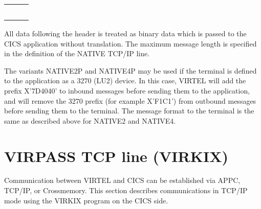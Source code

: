 \documentclass[letterpaper,10pt,english]{sphinxmanual}
\begin{document}
\begin{savenotes}
\begin{tabulary}{\linewidth}[t]{TTT}
{}%
\\
&&\\
&&\\
&&\\
\sphinxbottomrule
\end{tabulary}
\sphinxtableafterendhook\par
\sphinxattableend\end{savenotes}

\sphinxAtStartPar
{}

\sphinxAtStartPar
All data following the header is treated as binary data which is passed to the CICS application without translation. The maximum message length is specified in the definition of the NATIVE TCP/IP line.

\sphinxAtStartPar
The variants NATIVE2P and NATIVE4P may be used if the terminal is defined to the application as a 3270 (LU2) device. In this case, VIRTEL will add the prefix X’7D4040’ to inbound messages before sending them to the application, and will remove the 3270 prefix (for example X’F1C1’) from outbound messages before sending them to the terminal. The message format to the terminal is the same as described above for NATIVE2 and NATIVE4.

\newpage

\ignorespaces 

\section{VIRPASS TCP line (VIRKIX)}
\label{\detokenize{connectivity_guide:virpass-tcp-line-virkix}}\label{\detokenize{connectivity_guide:index-42}}
\sphinxAtStartPar
Communication between VIRTEL and CICS can be established via APPC, TCP/IP, or Cross\sphinxhyphen{}memory. This section describes communications in TCP/IP mode using the VIRKIX program on the CICS side.

\sphinxAtStartPar
{}
\end{document}
